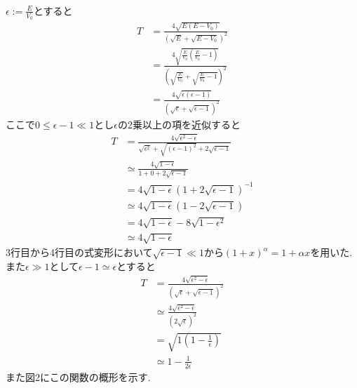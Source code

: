 \subsubsection{}
$\epsilon:=\frac{E}{V_0}$とすると
\begin{align}
  T&=\frac{4\sqrt{E(E-V_0)}}{(\sqrt{E}+\sqrt{E-V_0})^2}\\
  &=\frac{4\sqrt{\frac{E}{V_0}(\frac{E}{V_0}-1)}}{(\sqrt{\frac{E}{V_0}}+\sqrt{\frac{E}{V_0}-1})^2}\\
  &=\frac{4\sqrt{\epsilon(\epsilon-1)}}{(\sqrt{\epsilon}+\sqrt{\epsilon-1})^2}
\end{align}
ここで$0\leq\epsilon-1\ll1$とし$\epsilon$の2乗以上の項を近似すると
\begin{align}
  T&=\frac{4\sqrt{\epsilon^2-\epsilon}}{\sqrt{\epsilon^2}+\sqrt{(\epsilon-1)^2}+2\sqrt{\epsilon-1}}\\
  &\simeq\frac{4\sqrt{1-\epsilon}}{1+0+2\sqrt{\epsilon-1}}\\
  &=4\sqrt{1-\epsilon}\left(1+2\sqrt{\epsilon-1}\right)^{-1}\\
  &\simeq4\sqrt{1-\epsilon}\left(1-2\sqrt{\epsilon-1}\right)\\
  &=4\sqrt{1-\epsilon}-8\sqrt{1-\epsilon^2}\\
  &\simeq4\sqrt{1-\epsilon}\nonumber
\end{align}
3行目から4行目の式変形において$\sqrt{\epsilon-1}\ll1$から$(1+x)^\alpha=1+\alpha x$を用いた.\\
また$\epsilon\gg1$として$\epsilon-1\simeq\epsilon$とすると
\begin{align}
  T&=\frac{4\sqrt{\epsilon^2-\epsilon}}{(\sqrt{\epsilon}+\sqrt{\epsilon-1})^2}\\
  &\simeq\frac{4\sqrt{\epsilon^2-\epsilon}}{(2\sqrt{\epsilon})^2}\\
  &=\sqrt{1(1-\frac{1}{\epsilon})}\\
  &\simeq1-\frac{1}{2\epsilon}\nonumber
\end{align}
また図2にこの関数の概形を示す.
